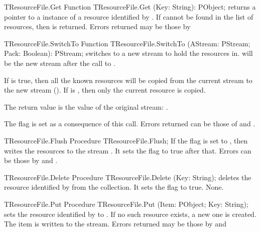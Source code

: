 \begin{function}{TResourceFile.Get}
\Declaration
Function TResourceFile.Get (Key: String): PObject;
\Description
{} returns a pointer to a instance of a resource identified by
. If  cannot be found in the list of resources, then
 is returned.
\Errors
Errors returned may be those by 
\SeeAlso
\end{function}

\begin{function}{TResourceFile.SwitchTo}
\Declaration
Function TResourceFile.SwitchTo (AStream: PStream; Pack: Boolean): PStream;
\Description
{} switches to a new stream to hold the resources in.
 will be the new stream after the call to .

If  is true, then all the known resources will be copied from 
the current stream to the new stream (). If  is 
, then only the current resource is copied.

The return value is the value of the original stream: .

The  flag is set as a consequence of this call.
\Errors
Errors returned can be those of  and
.
\SeeAlso
{}
\end{function}

\begin{procedure}{TResourceFile.Flush}
\Declaration
Procedure TResourceFile.Flush;
\Description
If the  flag is set to , then  
writes the resources to the stream . It sets the 
flag to true after that.
\Errors
Errors can be those by  and .
\SeeAlso
{}
\end{procedure}

\begin{procedure}{TResourceFile.Delete}
\Declaration
Procedure TResourceFile.Delete (Key: String);
\Description
{} deletes the resource identified by  from the
collection. It sets the  flag to true.
\Errors
None.
\SeeAlso
{}
\end{procedure}

\begin{procedure}{TResourceFile.Put}
\Declaration
Procedure TResourceFile.Put (Item: PObject; Key: String);
\Description
{} sets the resource identified by  to .
If no such resource exists, a new one is created. The item is written
to the stream.
\Errors
Errors returned may be those by  and 
\SeeAlso
{}
\end{procedure}

